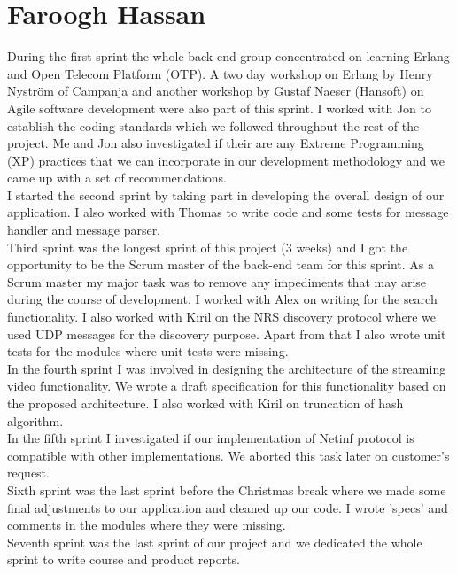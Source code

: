 \section{Faroogh Hassan}

During the first sprint the whole back-end group concentrated on learning Erlang and Open Telecom Platform (OTP). A two day workshop on Erlang by Henry Nyström of Campanja and another workshop by Gustaf Naeser (Hansoft) on Agile software development were also part of this sprint. I worked with Jon to establish the coding standards which we followed throughout the rest of the project. Me and Jon also investigated if their are any Extreme Programming (XP) practices that we can incorporate in our development methodology and we came up with a set of recommendations. \\

I started the second sprint by taking part in developing the overall design of our application. I also worked with Thomas to write code and some tests for message handler and message parser.\\

Third sprint was the longest sprint of this project (3 weeks) and I got the opportunity to be the Scrum master of the back-end team for this sprint. As a Scrum master my major task was to remove any impediments that may arise during the course of development. I worked with Alex on writing for the search functionality. I also worked with Kiril on the NRS discovery protocol where we used UDP messages for the discovery purpose. Apart from that I also wrote unit tests for the modules where unit tests were missing. \\

In the fourth sprint I was involved in designing the architecture of the streaming video functionality. We wrote a draft specification for this functionality based on the proposed architecture. I also worked with Kiril on truncation of hash algorithm. \\

In the fifth sprint I investigated if our implementation of Netinf protocol is compatible with other implementations. We aborted this task later on customer's request. \\

Sixth sprint was the last sprint before the Christmas break where we made some final adjustments to our application and cleaned up our code. I wrote 'specs' and comments in the modules where they were missing. \\

Seventh sprint was the last sprint of our project and we dedicated the whole sprint to write course and product reports. \\
